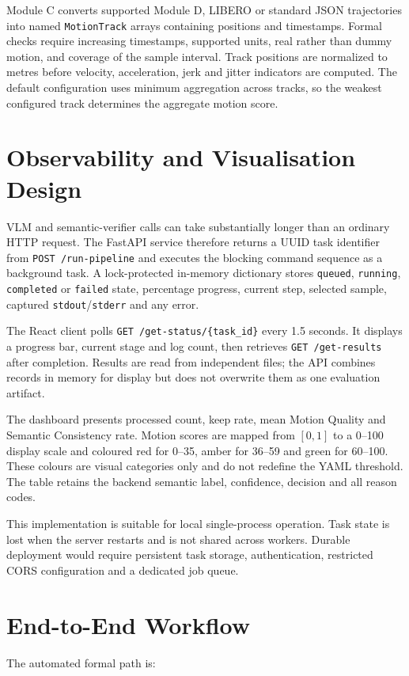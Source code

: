 \documentclass[11pt,oneside]{report}
\begin{document}
Module C converts supported Module D, LIBERO or standard JSON trajectories into
named \texttt{MotionTrack} arrays containing positions and timestamps. Formal
checks require increasing timestamps, supported units, real rather than dummy
motion, and coverage of the sample interval. Track positions are normalized to
metres before velocity, acceleration, jerk and jitter indicators are computed.
The default configuration uses minimum aggregation across tracks, so the
weakest configured track determines the aggregate motion score.

\section{Observability and Visualisation Design}
VLM and semantic-verifier calls can take substantially longer than an ordinary
HTTP request. The FastAPI service therefore returns a UUID task identifier from
\texttt{POST /run-pipeline} and executes the blocking command sequence as a
background task. A lock-protected in-memory dictionary stores
\texttt{queued}, \texttt{running}, \texttt{completed} or \texttt{failed}
state, percentage progress, current step, selected sample, captured
\texttt{stdout}/\texttt{stderr} and any error.

The React client polls \texttt{GET /get-status/\{task\_id\}} every 1.5 seconds.
It displays a progress bar, current stage and log count, then retrieves
\texttt{GET /get-results} after completion. Results are read from independent
 files; the API combines records in memory for
display but does not overwrite them as one evaluation artifact.

The dashboard presents processed count, keep rate, mean Motion Quality and
Semantic Consistency rate. Motion scores are mapped from $[0,1]$ to a 0--100
display scale and coloured red for 0--35, amber for 36--59 and green for
60--100. These colours are visual categories only and do not redefine the YAML
threshold. The table retains the backend semantic label, confidence, decision
and all reason codes.

This implementation is suitable for local single-process operation. Task state
is lost when the server restarts and is not shared across workers. Durable
deployment would require persistent task storage, authentication, restricted
CORS configuration and a dedicated job queue.

\section{End-to-End Workflow}
The automated formal path is:
\end{document}
